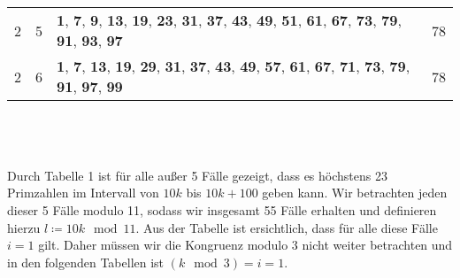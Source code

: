 \documentclass{article}
\begin{document}
\begin{tabular}{||c|c|l|c||}
	2&5&\textbf{1}, \textbf{7}, \textbf{9}, \textbf{13}, \textbf{19}, \textbf{23}, \textbf{31}, \textbf{37}, \textbf{43}, \textbf{49}, \textbf{51}, \textbf{61}, \textbf{67}, \textbf{73}, \textbf{79}, \textbf{91}, \textbf{93}, \textbf{97}&78\\
	2&6&\textbf{1}, \textbf{7}, \textbf{13}, \textbf{19}, \textbf{29}, \textbf{31}, \textbf{37}, \textbf{43}, \textbf{49}, \textbf{57}, \textbf{61}, \textbf{67}, \textbf{71}, \textbf{73}, \textbf{79}, \textbf{91}, \textbf{97}, \textbf{99}&78\\
\end{tabular}\\\ \\\ \\
    Durch Tabelle 1 ist für alle außer 5 Fälle gezeigt, dass es höchstens 23 Primzahlen im Intervall von $10k$ bis $10k+100$ geben kann. 
    Wir betrachten jeden dieser 5 Fälle modulo 11, sodass wir insgesamt 55 Fälle erhalten und definieren hierzu $l \coloneqq 10k \mod 11$. Aus der Tabelle ist ersichtlich, dass für alle diese Fälle $i=1$ gilt. 
    Daher müssen wir die Kongruenz modulo $3$ nicht weiter betrachten und in den folgenden Tabellen ist $(k \mod 3) = i = 1$.\\
\end{document}
